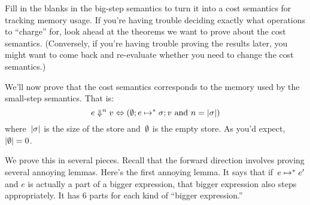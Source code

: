 \documentclass{article}
\begin{document}
{
  \centering
  \def \MathparLineskip {\lineskip=0.43cm}
}

\begin{task}
  Fill in the blanks in the big-step semantics to turn it into a cost semantics
  for tracking memory usage.
  If you're having trouble deciding exactly what operations to ``charge'' for,
  look ahead at the theorems we want to prove about the cost semantics.
  (Conversely, if you're having trouble proving the results later, you
  might want to come back and re-evaluate whether you need to change the
  cost semantics.)
\end{task}

We'll now prove that the cost semantics corresponds to the memory used by
the small-step semantics.
%
That is:
\[
\eval[n]{e}{v} \Leftrightarrow (\cfg{\estore}{e} \step^* \cfg{\store}{v}
\text{~and~} n = |\store|)
\]
where~$|\store|$ is the size of the store and~$\estore$ is the empty store.
%
As you'd expect, $|\estore| = 0$.

We prove this in several pieces.
%
Recall that the forward direction involves proving several annoying lemmas.
%
Here's the first annoying lemma.
%
It says that if~$e \step^* e'$ and $e$ is actually a part of a bigger
expression, that bigger expression also steps appropriately.
%
It has 6 parts for each kind of ``bigger expression.''
\end{document}
